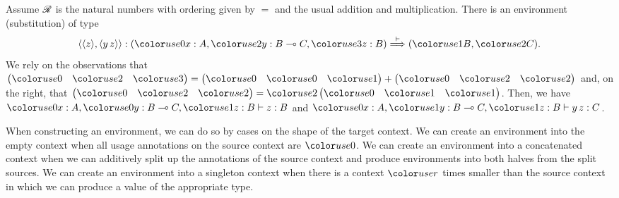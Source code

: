 \begin{example}
  Assume $\mathscr R$ is the natural numbers with ordering given by $=$ and the usual
  addition and multiplication.
  There is an environment (substitution) of type
  \[
    \alr{\alr{z},\alr{y\,z}} :
    \plr{\gr0x : A, \gr2y : B \multimap C, \gr3z : B} \env\vdash
    \plr{\gr1B, \gr2C}.
  \]
  We rely on the observations that
  $\begin{pmatrix} \gr0 & \gr2 & \gr3 \end{pmatrix} =
  \begin{pmatrix} \gr0 & \gr0 & \gr1 \end{pmatrix}
  + \begin{pmatrix} \gr0 & \gr2 & \gr2 \end{pmatrix}$ and, on the right, that
  $\begin{pmatrix} \gr0 & \gr2 & \gr2 \end{pmatrix} =
  \gr2\begin{pmatrix} \gr0 & \gr1 & \gr1 \end{pmatrix}$.
  Then, we have $\gr0x : A, \gr0y : B \multimap C, \gr1z : B \vdash z : B$ and
  $\gr0x : A, \gr1y : B \multimap C, \gr1z : B \vdash y\,z : C$.
\end{example}

When constructing an environment, we can do so by cases on the shape of the
target context.
We can create an environment into the empty context when all usage annotations
on the source context are $\gr0$.
We can create an environment into a concatenated context when we can additively
split up the annotations of the source context and produce environments into
both halves from the split sources.
We can create an environment into a singleton context when there is a context
$\gr r$ times smaller than the source context in which we can produce a value
of the appropriate type.

